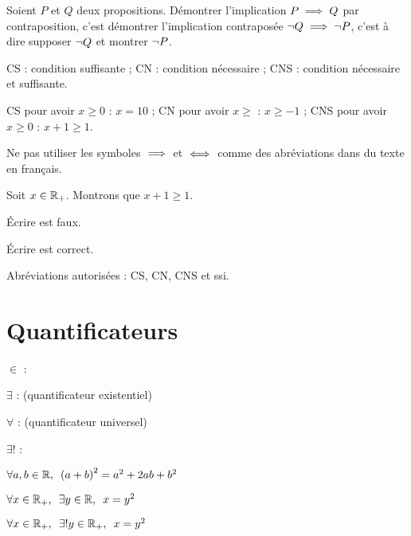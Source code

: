 \begin{defi}
Soient \(P\) et \(Q\) deux propositions. Démontrer l'implication \(P\implies Q\) par contraposition, c'est démontrer l'implication contraposée \(\lnot Q\implies\lnot P\), c'est à dire supposer \(\lnot Q\) et montrer \(\lnot P\).
\end{defi}

\begin{defi}
CS : condition suffisante ; CN : condition nécessaire ; CNS : condition nécessaire et suffisante.
\end{defi}

\begin{ex}
CS pour avoir \(x\geq0\) : \(x=10\) ; CN pour avoir \(x\geq\) : \(x\geq-1\) ; CNS pour avoir \(x\geq0\) : \(x+1\geq1\).
\end{ex}

\begin{rem}
Ne pas utiliser les symboles \(\implies\) et \(\iff\) comme des abréviations dans du texte en français.
\end{rem}

\begin{ex}
Soit \(x\in\mathbb{R}_+\). Montrons que \(x+1\geq1\).

Écrire  est faux.

Écrire  est correct.
\end{ex}

\begin{rem}
Abréviations autorisées : CS, CN, CNS et ssi.
\end{rem}

\section{Quantificateurs}

\begin{nota}
\(\in\) : 

\(\exists\) :  (quantificateur existentiel)

\(\forall\) :  (quantificateur universel)

\(\exists!\) : 
\end{nota}

\begin{ex}
\(\quantifs{\forall a,b\in\R}\paren{a+b}^2=a^2+2ab+b^2\)

\(\quantifs{\forall x\in\Rp;\exists y\in\R}x=y^2\)

\(\quantifs{\forall x\in\Rp;\exists!y\in\Rp}x=y^2\)
\end{ex}

